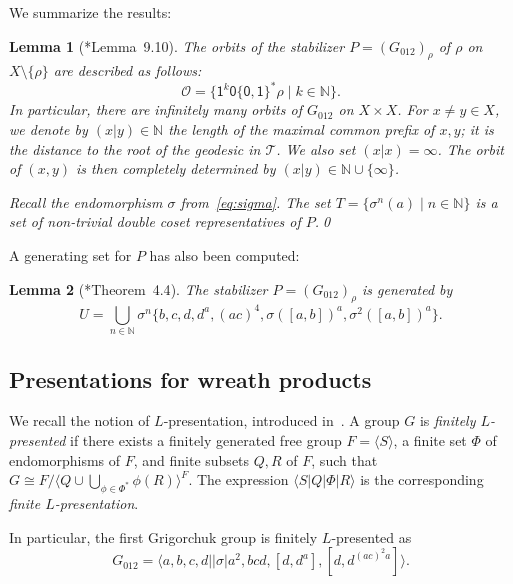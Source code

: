 \documentclass{amsart}
\newcommand\N{\mathbb{N}}
\newcommand\Grig{{G_{012}}}
\newtheorem{lemma}{Lemma}[section]
\theoremstyle{definition}
\begin{document}
\noindent We summarize the results:
\begin{lemma}[\cite{bartholdi-g:parabolic}*{Lemma~9.10}]\label{lem:orbits2}
  The orbits of the stabilizer $P=(\Grig)_\rho$ of $\rho$ on
  $X\setminus\{\rho\}$ are described as follows:
  \begin{equation}\label{eq:orbits}
    \mathcal O=\{\mathsf1^k\mathsf0\{\mathsf0,\mathsf1\}^*\rho\mid k\in\N\}.
  \end{equation}
  In particular, there are infinitely many orbits of $\Grig$ on
  $X\times X$.  For $x\neq y\in X$, we denote by $(x|y)\in\N$ the
  length of the maximal common prefix of $x,y$; it is the distance to
  the root of the geodesic in $\mathcal T$. We also set
  $(x|x)=\infty$.  The orbit of $(x,y)$ is then completely determined
  by $(x|y)\in\N\cup\{\infty\}$.

  Recall the endomorphism $\sigma$ from~\eqref{eq:sigma}. The set
  $T=\{\sigma^n(a)\mid n\in\N\}$ is a set of non-trivial double coset
  representatives of $P$.\qed
\end{lemma}

\noindent A generating set for $P$ has also been computed:
\begin{lemma}[\cite{bartholdi-g:parabolic}*{Theorem~4.4}]\label{lem:genP}
  The stabilizer $P=(\Grig)_\rho$ is generated by
  \[U=\bigcup_{n\in\N}\sigma^n\{b,c,d,d^a,(ac)^4,\sigma([a,b])^a,\sigma^2([a,b])^a\}.\]
\end{lemma}

\subsection{Presentations for wreath products}
We recall the notion of $L$-presentation, introduced
in~\cite{bartholdi:lpres}. A group $G$ is \emph{finitely
  $L$-presented} if there exists a finitely generated free group
$F=\langle S\rangle$, a finite set $\Phi$ of endomorphisms of $F$, and
finite subsets $Q,R$ of $F$, such that $G\cong F/\langle
Q\cup\bigcup_{\phi\in\Phi^*}\phi(R)\rangle^F$. The expression $\langle
S|Q|\Phi|R\rangle$ is the corresponding \emph{finite $L$-presentation}.

In particular, the first Grigorchuk group is finitely $L$-presented as
\[\Grig=\langle a,b,c,d||\sigma|a^2,bcd,[d,d^a],[d,d^{(ac)^2a}]\rangle.\]
\end{document}
